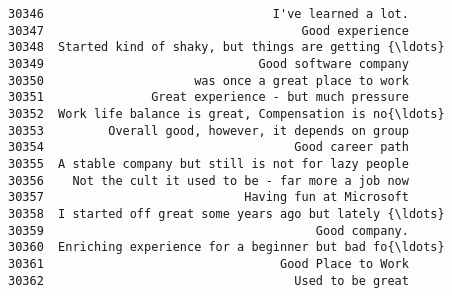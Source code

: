 \documentclass[11pt]{article}
\begin{document}
\begin{tcolorbox}[breakable, boxrule=.5pt, size=fbox, pad at break*=1mm, opacityfill=0]
\begin{Verbatim}[commandchars=\\\{\}]
30346                                I've learned a lot.
30347                                    Good experience
30348  Started kind of shaky, but things are getting {\ldots}
30349                              Good software company
30350                     was once a great place to work
30351               Great experience - but much pressure
30352  Work life balance is great, Compensation is no{\ldots}
30353         Overall good, however, it depends on group
30354                                   Good career path
30355  A stable company but still is not for lazy people
30356    Not the cult it used to be - far more a job now
30357                            Having fun at Microsoft
30358  I started off great some years ago but lately {\ldots}
30359                                      Good company.
30360  Enriching experience for a beginner but bad fo{\ldots}
30361                                 Good Place to Work
30362                                   Used to be great


\end{Verbatim}
\end{tcolorbox}
\end{document}
